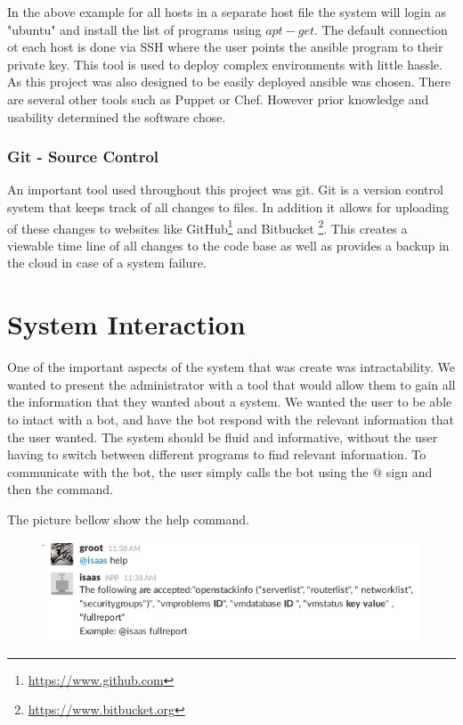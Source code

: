 \documentclass[12pt]{article}
\begin{document}
In the above example for all hosts in a separate host file the system will login as "ubuntu" and install the list of programs using $apt-get$. The default connection ot each host is done via SSH where the user points the ansible program to their private key.  This tool is used to deploy complex environments with little hassle.  As this project was also designed to be easily deployed ansible was chosen. There are several other tools such as Puppet or Chef. However prior knowledge and usability determined the software chose.

\subsubsection{Git - Source Control}
An important tool used throughout this project was git. Git is a version control system that keeps track of all changes to files. In addition it allows for uploading of these changes to websites like GitHub\footnote{\href{https://www.github.com}{https://www.github.com}} and Bitbucket \footnote{\href{https://www.bitbucket.org}{https://www.bitbucket.org}}. This creates a viewable time line of all changes to the code base as well as provides a backup in the cloud in case of a system failure.

\section{System Interaction}
One of the important aspects of the system that was create was intractability. We wanted to present the administrator with a tool that would allow them to gain all the information that they wanted about a system. We wanted the user to be able to intact with a bot, and have the bot respond with the relevant information that the user wanted. The system should be fluid and informative, without the user having to switch between different programs to find relevant information. To communicate with the bot, the user simply calls the bot using the $@$ sign and then the command.

The picture bellow show the help command.
\begin{figure}[H]
    \begin{mdframed}
    \includegraphics[scale=.5]{./pic/2017-06-26-113851_606x161_scrot.png}
    \end{mdframed}
\end{figure}
\end{document}
